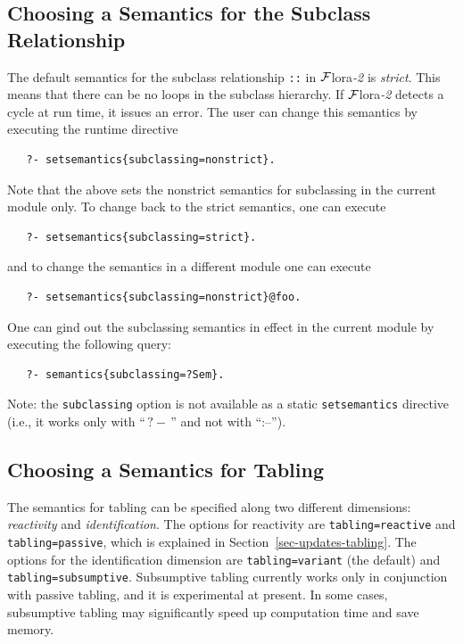 \documentclass[11pt]{article}
\newcommand{\FLORA}{{\mbox{\sc ${\cal F}${lora}\rm\emph{-2}}}\xspace}
\newcommand{\FLSYSTEM}{\FLORA}
\newcommand{\query}{\mbox{$\, ?\! - \, $}}                  %
\begin{document}
\subsection{Choosing a Semantics for the Subclass Relationship}

The default semantics for the subclass relationship \texttt{::} in
\FLSYSTEM is \emph{strict}. This means that there can be no loops in the
subclass hierarchy. If \FLSYSTEM detects a cycle at run time, it issues an
error.  The user can change this semantics by executing the runtime directive
\begin{verbatim}
   ?- setsemantics{subclassing=nonstrict}.
\end{verbatim}
Note that the above sets the nonstrict semantics for subclassing in the
current module only. To change back to the strict semantics, one can execute
\begin{verbatim}
   ?- setsemantics{subclassing=strict}.
\end{verbatim}
and to change the semantics in a different module one can execute
\begin{verbatim}
   ?- setsemantics{subclassing=nonstrict}@foo.
\end{verbatim}

One can gind out the subclassing semantics in effect in the current module
by executing the following query:
\begin{verbatim}
   ?- semantics{subclassing=?Sem}.
\end{verbatim}
Note: the \texttt{subclassing} option is not available as a static
\texttt{setsemantics} directive (i.e., it works only with ``$\query$''
and not with ``:--'').

\subsection{Choosing a Semantics for Tabling}

The semantics for tabling can be specified along two different dimensions:
\emph{reactivity} and \emph{identification}.
The options for reactivity are \texttt{tabling=reactive} and
\texttt{tabling=passive}, which is explained in
Section~\ref{sec-updates-tabling}.
The options for the identification dimension are
\texttt{tabling=variant} (the default) and \texttt{tabling=subsumptive}.
Subsumptive tabling currently works only in conjunction with passive tabling,
and it is experimental at present.  In some cases, subsumptive tabling may
significantly speed up computation time and save memory.
\end{document}
